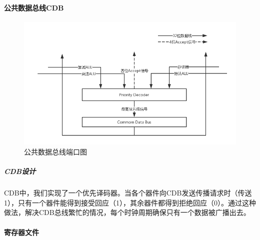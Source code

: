 \documentclass[twoside]{article}
\begin{document}
\paragraph{公共数据总线CDB}

\begin{figure}[htp]
    \centering
    \includegraphics[width=13cm]{"./figure/CDB.png"}
    \caption{公共数据总线端口图}
    \label{fig:CDB}
\end{figure}

\subparagraph{CDB设计}
CDB中，我们实现了一个优先译码器。当各个器件向CDB发送传播请求时（传送1），只有一个器件能得到接受回应（1），其余器件都得到拒绝回应（0）。通过这种做法，解决CDB总线繁忙的情况，每个时钟周期确保只有一个数据被广播出去。  

\paragraph{寄存器文件}
\end{document}
